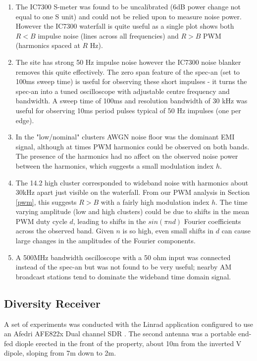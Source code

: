 \documentclass{article}
\begin{document}
\begin{enumerate}
\item The IC7300 S-meter was found to be uncalibrated (6dB power change not equal to one S unit) and could not be relied upon to measure noise power.  However the IC7300 waterfall is quite useful as a single plot shows both $R<B$ impulse noise (lines across all frequencies) and $R>B$ PWM (harmonics spaced at $R$ Hz).
\item The site has strong 50 Hz impulse noise however the IC7300 noise blanker removes this quite effectively.  The zero span feature of the spec-an (set to 100ms sweep time) is useful for observing these short impulses - it turns the spec-an into a tuned oscilloscope with adjustable centre frequency and bandwidth.  A sweep time of 100ms and resolution bandwidth of 30 kHz was useful for observing 10ms period pulses typical of 50 Hz impulses (one per edge).
\item In the "low/nominal" clusters AWGN noise floor was the dominant EMI signal, although at times PWM harmonics could be observed on both bands. The presence of the harmonics had no affect on the observed noise power between the harmonics, which suggests a small modulation index $h$.
\item The 14.2 high cluster corresponded to wideband noise with harmonics about 30kHz apart just visible on the waterfall.  From our PWM analysis in Section \ref{pwm}, this suggests $R>B$ with a fairly high modulation index $h$.  The time varying amplitude (low and high clusters) could be due to shifts in the mean PWM duty cycle $d$, leading to shifts in the $sin(\pi n d)$ Fourier coefficients across the observed band.  Given $n$ is so high, even small shifts in $d$ can cause large changes in the amplitudes of the Fourier components.
\item A 500MHz bandwidth oscilloscope with a 50 ohm input was connected instead of the spec-an but was not found to be very useful; nearby AM broadcast stations tend to dominate the wideband time domain signal.
\end{enumerate}

\subsection{Diversity Receiver}

A set of experiments was conducted with the Linrad application \cite{linrad_home} configured to use an Afedri AFE822x Dual channel SDR \cite{afedri_dual}.  The second antenna was a portable end-fed diople erected in the front of the property, about 10m from the inverted V dipole, sloping from 7m down to 2m.
\end{document}
